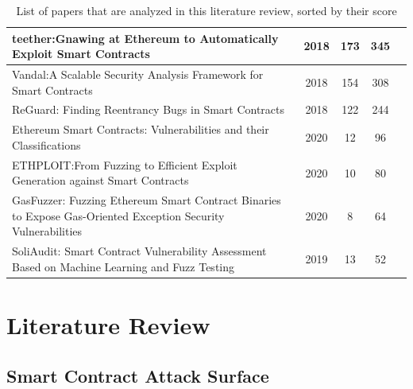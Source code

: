 \documentclass[a4paper,11pt]{article}
\begin{document}
\begin{table}[t]
\begin{center}
\begin{tabular}{||p{11cm}|c|c|c|c||}
                teether:Gnawing at Ethereum to Automatically Exploit Smart Contracts & 2018  & 173 & 345 & \cite{krupp2018teether} \\
                \hline
                Vandal:A Scalable Security Analysis Framework for Smart Contracts & 2018  & 154 & 308 & \cite{brent2018vandal} \\
                \hline
                ReGuard: Finding Reentrancy Bugs in Smart Contracts & 2018  & 122 & 244 & \cite{liu2018reguard} \\
                \hline
                Ethereum Smart Contracts: Vulnerabilities and their Classifications & 2020  & 12 & 96 & \cite{khan2020ethereum} \\
                \hline
                ETHPLOIT:From Fuzzing to Efficient Exploit Generation against Smart Contracts & 2020  & 10 & 80 & \cite{zhang2020ethploit} \\
                \hline
                GasFuzzer: Fuzzing Ethereum Smart Contract Binaries to Expose Gas-Oriented Exception Security Vulnerabilities & 2020  & 8 & 64 & \cite{ashraf2020gasfuzzer} \\
                \hline
                SoliAudit: Smart Contract Vulnerability Assessment Based on Machine Learning and Fuzz Testing & 2019  & 13 & 52 & \cite{liao2019soliaudit} \\
                \hline
            \end{tabular}
            \label{table:studies}
            \caption{List of papers that are analyzed in this literature review, sorted by their score}
        \end{center}
\end{table}

\section{Literature Review}

\subsection{Smart Contract Attack Surface}
\end{document}
